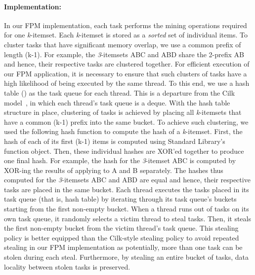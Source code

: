 \documentclass{IOS-Book-Article}
\begin{document}
\paragraph{Implementation:} In our FPM implementation, each task performs the
mining operations required for one \textit{k}-itemset. Each \textit{k}-itemset
is stored as a \textit{sorted} set of individual items. 
To cluster tasks that have significant memory overlap, we use a common prefix
of length (k-1).  For example, the \textit{3}-itemsets ABC and ABD share the
2-prefix AB and hence, their respective tasks are clustered together. For
efficient execution of our FPM application, it is necessary to ensure that such
clusters of tasks have a high likelihood of being executed by the same thread.
To this end, we use a hash table () as the task queue for
each thread.  This is a departure from the Cilk model~\cite{FrigoLeRa98}, in
which each thread's task queue is a deque. With the hash table structure in
place, clustering of tasks is achieved by placing all \textit{k}-itemsets that
have a common (k-1) prefix into the same bucket. To achieve such clustering, we
used the following hash function to compute the hash of a \textit{k}-itemset.
First, the hash of each of its first (k-1) items is computed using \Cpp{}
Standard Library's~\cite{stepa.lee-1994:the.s:TR}  function
object. Then, these individual hashes are XOR'ed together to produce one final
hash.  For example, the hash for the \textit{3}-itemset ABC is computed by
XOR-ing the results of applying  to A and B separately. The
hashes thus computed for the \textit{3}-itemsets ABC and ABD are equal
and hence, their respective tasks are placed in the same bucket.
Each thread executes the tasks placed in its task queue (that is, hash table)
by iterating through its task queue's buckets starting from the first non-empty
bucket. 
When a thread runs out of tasks on its own task queue, it randomly selects a
victim thread to steal tasks. Then, it steals the first non-empty bucket from
the victim thread's task queue. This stealing policy is better equipped than
the Cilk-style stealing policy to avoid repeated stealing in our FPM
implementation as potentially, more than one task can be stolen during each
steal.  Furthermore, by stealing an entire bucket of tasks, data locality
between stolen tasks is preserved.

\end{document}

